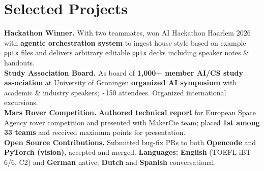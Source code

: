 \documentclass[10pt,a4paper]{article}
\begin{document}
\section*{Selected Projects}
\textbf{Hackathon Winner.} With two teammates, won AI Hackathon Haarlem 2026 with \textbf{agentic orchestration system} to ingest house style based on example \texttt{pptx} files and delivers arbitrary editable \texttt{pptx} decks including speaker notes \& handouts.\\
\textbf{Study Association Board.} As board of \textbf{1,000+ member AI/CS study association} at University of Groningen \textbf{organized AI symposium} with academic \& industry speakers; \textasciitilde 150 attendees. Organized international excursions.\\
\textbf{Mars Rover Competition.} \textbf{Authored technical report} for European Space Agency rover competition and presented with MakerCie team; placed \textbf{1st among 33 teams} and received maximum points for presentation.\\
\textbf{Open Source Contributions.} Submitted bug-fix PRs to both \textbf{Opencode} and \textbf{PyTorch (vision)}, accepted and merged.
\vfill
\textbf{Languages:} \textbf{English} (TOEFL iBT 6/6, C2) and \textbf{German} native; \textbf{Dutch} and \textbf{Spanish} conversational.
\end{document}
